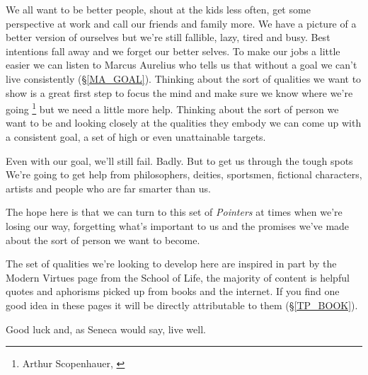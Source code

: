 \cleardoublepage
{\small
We all want to be better people, shout at the kids less often, get some perspective at work and call our friends and family more. We have a picture of a better version of ourselves but we're still fallible, lazy, tired and busy. Best intentions fall away and we forget our better selves. 
To make our jobs a little easier we can listen to Marcus Aurelius who tells us that without a goal we can't live consistently (\S \ref{MA_GOAL}). Thinking about the sort of qualities we want to show is a great first step to focus the mind and make sure we know where we're going \footnote{Arthur Scopenhauer, \cite{SCM}} but we need a little more help. Thinking about the sort of person we want to be and looking closely at the qualities they embody we can come up with a consistent goal, a set of high or even unattainable targets. 

Even with our goal, we'll still fail. Badly. But to get us through the tough spots We're going to get help from philosophers, deities, sportsmen, fictional characters, artists and people who are far smarter than us. 

The hope here is that we can turn to this set of \emph{Pointers} at times when we're losing our way, forgetting what's important to us and the promises we've made about the sort of person we want to become.

The set of qualities we're looking to develop here are inspired in part by the Modern Virtues page from the School of Life, the majority of content is helpful quotes and aphorisms picked up from books and the internet. If you find one good idea in these pages it will be directly attributable to them (\S \ref{TP_BOOK}). 

Good luck and, as Seneca would say, live well.

}